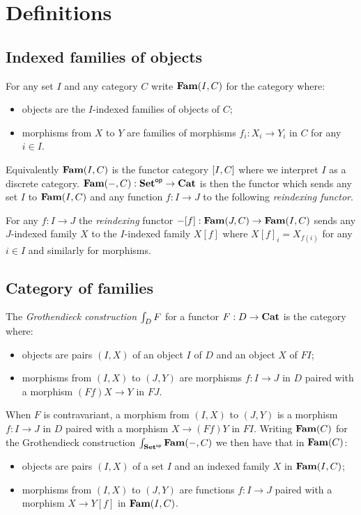 \section{Definitions}

\subsection{Indexed families of objects}

For any set $I$ and any category $C$ write $\mathbf{Fam}(I,C)$ for the category where:
\begin{itemize}
\item objects are the $I$-indexed families of objects of $C$;
\item morphisms from $X$ to $Y$ are families of morphisms $f_i: X_i \to Y_i$ in $C$ for any $i \in I$.
\end{itemize}

\noindent Equivalently $\mathbf{Fam}(I,C)$ is the functor category $[I,C]$ where we interpret $I$ as a discrete
category. $\mathbf{Fam}(-,C): \mathbf{Set}^{\mathsf{op}} \to \mathbf{Cat}$ is then the functor which sends any set $I$ to $\mathbf{Fam}(I,C)$ and any
function $f: I \to J$ to the following \emph{reindexing functor}.

\begin{definition}[Reindexing]
For any $f: I \to J$ the \emph{reindexing} functor $-[f]: \mathbf{Fam}(J,C) \to \mathbf{Fam}(I,C)$ sends any
$J$-indexed family $X$ to the $I$-indexed family $X[f]$ where $X[f]_i = X_{f(i)}$ for any $i \in I$ and
similarly for morphisms.
\end{definition}

\subsection{Category of families}

The \emph{Grothendieck construction} $\int_{D}F$ for a functor $F: D \to \mathbf{Cat}$ is the category where:
\begin{itemize}
\item objects are pairs $(I, X)$ of an object $I$ of $D$ and an object $X$ of $FI$;
\item morphisms from $(I, X)$ to $(J, Y)$ are morphisms $f: I \to J$ in $D$ paired with a morphism $(Ff)X
\to Y$ in $FJ$.
\end{itemize}

\noindent When $F$ is contravariant, a morphism from $(I, X)$ to $(J, Y)$ is a morphism $f: I \to J$ in $D$
paired with a morphism $X \to (Ff)Y$ in $FI$. Writing $\mathbf{Fam}(C)$ for the Grothendieck construction
$\int_{\mathbf{Set}^{\mathsf{op}}}\mathbf{Fam}(-,C)$ we then have that in $\mathbf{Fam}(C)$:
\begin{itemize}
\item objects are pairs $(I, X)$ of a set $I$ and an indexed family $X$ in $\mathbf{Fam}(I,C)$;
\item morphisms from $(I, X)$ to $(J, Y)$ are functions $f: I \to J$ paired with a morphism $X \to Y[f]$ in
$\mathbf{Fam}(I,C)$.
\end{itemize}

